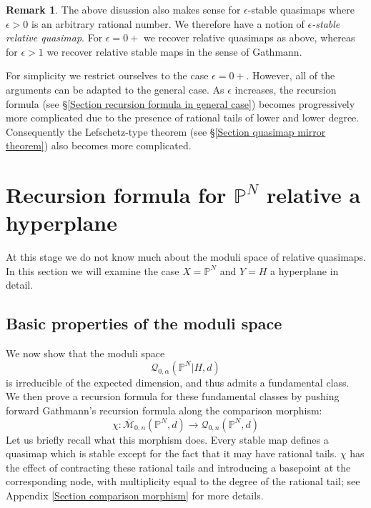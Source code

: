 \documentclass[11pt]{amsart}
\newcommand{\M}[4]{\overline{\mathcal{M}}_{#1,#2}(#3,#4)}
\newcommand{\Q}[4]{\mathcal{Q}_{#1,#2}(#3,#4)}
\newcommand{\PP}{\mathbb P}
\renewcommand{\to}{\rightarrow}
\theoremstyle{definition}
\theoremstyle{definition}
\newtheorem{remark}[thm]{Remark}
\begin{document}
\begin{remark} The above disussion also makes sense for $\epsilon$-stable quasimaps where $\epsilon > 0$ is an arbitrary rational number. We therefore have a notion of \emph{$\epsilon$-stable relative quasimap}. For $\epsilon=0+$ we recover relative quasimaps as above, whereas for $\epsilon>1$ we recover relative stable maps in the sense of Gathmann.

For simplicity we restrict ourselves to the case $\epsilon=0+$. However, all of the arguments can be adapted to the general case. As $\epsilon$ increases, the recursion formula (see \S \ref{Section recursion formula in general case}) becomes progressively more complicated due to the presence of rational tails of lower and lower degree. Consequently the Lefschetz-type theorem (see \S \ref{Section quasimap mirror theorem}) also becomes more complicated.
\end{remark}

\section{Recursion formula for $\PP^N$ relative a hyperplane} \label{Section recursion for PN}
At this stage we do not know much about the moduli space of relative quasimaps. In this section we will examine the case $X=\PP^N$ and $Y=H$ a hyperplane in detail.

\subsection{Basic properties of the moduli space} \label{Subsection basic properties of the moduli space}
We now show that the moduli space
\begin{equation*} \Q{0}{\alpha}{\PP^N|H}{d} \end{equation*}
is irreducible of the expected dimension, and thus admits a fundamental class. We then prove a recursion formula for these fundamental classes by pushing forward Gathmann's recursion formula along the comparison morphism:
\begin{equation*}\chi : \M{0}{n}{\PP^N}{d} \to \Q{0}{n}{\PP^N}{d} \end{equation*}
Let us briefly recall what this morphism does. Every stable map defines a quasimap which is stable except for the fact that it may have rational tails. $\chi$ has the effect of contracting these rational tails and introducing a basepoint at the corresponding node, with multiplicity equal to the degree of the rational tail; see Appendix \ref{Section comparison morphism} for more details.
\end{document}

